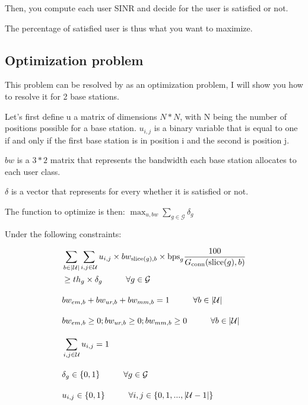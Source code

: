 \documentclass[letterpaper]{article}
\begin{document}
Then, you compute each user SINR and decide for the user is satisfied or not.

The percentage of satisfied user is thus what you want to maximize.

\subsection{Optimization problem}

This problem can be resolved by as an optimization problem, I will show you how to resolve it for 2 base stations.

Let's first define u a matrix of dimensions $N*N$, with N being the number of positions possible for a base station.
$u_{i,j}$ is a binary variable that is equal to one if and only if the first base station is in position i and the second is position j.

$bw$ is a $3*2$ matrix that represents the bandwidth each base station allocates to each user class.

$\delta$ is a vector that represents for every whether it is satisfied or not.

The function to optimize is then: $\max_{u,bw}\sum_{g\in\mathcal{G}}\delta_g$

Under the following constraints:

\begin{subequations}
    \allowdisplaybreaks
    \begin{align}
        & \sum_{b \in |\mathcal{U}|} \sum_{i, j \in \mathcal{U}} u_{i, j} \times bw_{\text{slice}(g), b} \times \text{bps}_g \frac{100}{G_{\text{conn}}(\text{slice}(g),b)} \nonumber \\
        & \geq th_g \times \delta_g \hspace{1cm} \forall g \in \mathcal{G} \\[1em]
        & bw_{em,b} + bw_{ur,b} + bw_{mm,b} = 1 \hspace{1cm} \forall b \in |\mathcal{U}| \\[1em]
        & bw_{em,b} \geq 0; bw_{ur,b} \geq 0; bw_{mm,b} \geq 0 \hspace{1cm} \forall b \in |\mathcal{U}| \\[1em]
        & \sum_{i,j \in \mathcal{U}}u_{i,j} = 1 \\[1em]
        & \delta_g \in \{0, 1\} \hspace{1cm} \forall g \in \mathcal{G} \\[1em] 
        & u_{i,j} \in \{0, 1\} \hspace{1cm} \forall i,j \in \{0, 1, ... , |\mathcal{U}-1|\}
    \end{align}\label{constr}
    \end{subequations}
\end{document}

